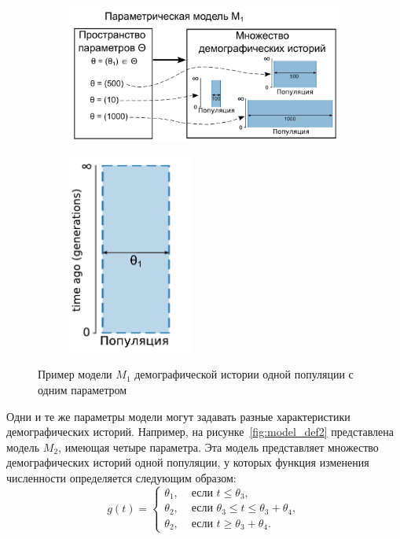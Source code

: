 \begin{figure}[ht]
    \centering
    \begin{subfigure}[b]{.59\textwidth}
    \includegraphics[width=\textwidth]{images_2/model_def.pdf}
    \caption{}
    \label{fig:model_def_1}
    \end{subfigure}%
    \begin{subfigure}[b]{.40\textwidth}
    \centering
    \includegraphics[width=0.45\textwidth]{images_2/model_pict.pdf}
    \caption{}
    \label{fig:model_def_2}
    \end{subfigure}
    \caption{Пример модели $M_1$ демографической истории одной популяции с одним параметром}
    \label{fig:model_def}
\end{figure}


Одни и те же параметры модели могут задавать разные характеристики демографических историй.
Например, на рисунке~\ref{fig:model_def2} представлена модель $M_2$, имеющая четыре параметра.
Эта модель представляет множество демографических историй одной популяции, у которых функция изменения численности определяется следующим образом:
$$
g(t) = 
\begin{cases}
    \theta_1, & \text{ если } t \leq \theta_3, \\
    \theta_2, & \text{ если } \theta_3 \leq t \leq \theta_3 + \theta_4, \\
    \theta_2, & \text{ если } t \geq \theta_3 + \theta_4.
\end{cases}
$$

